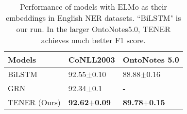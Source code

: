 \documentclass[11pt,a4paper]{article}
\begin{document}
\begin{table}[h]\small \setlength{\tabcolsep}{3pt}
  \begin{threeparttable}
  \begin{tabular}{p{12em}ll}
    \toprule
      Models                & CoNLL2003      & OntoNotes 5.0    \\ \midrule
      BiLSTM                & 92.55$\pm$0.10 & 88.88$\pm$0.16  \\
      GRN \citep{chen2019grn} & 92.34$\pm$0.1  & -               \\
      TENER (Ours)                & \textbf{92.62$\pm$0.09} & \textbf{89.78$\pm$0.15} \\
    \bottomrule
  \end{tabular}
  \end{threeparttable}
  \caption{Performance of models with ELMo as their embeddings in English NER datasets. ``BiLSTM" is our run. In the larger OntoNotes5.0, TENER achieves much better F1 score.} \label{tab:en_ner_elmo}
\end{table}
\end{document}
